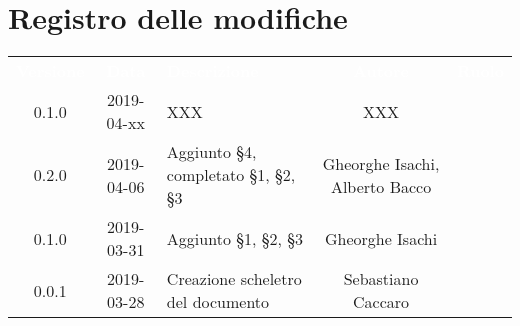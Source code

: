 \section*{Registro delle modifiche}
{
	\renewcommand{\arraystretch}{1.5}
	\centering
	\begin{longtable}{ c c C{6cm} c c }
		\textcolor{white}{\textbf{Versione}} & \textcolor{white}{\textbf{Data}} & \textcolor{white}{\textbf{Descrizione}} & \textcolor{white}{\textbf{Autore}} & \textcolor{white}{\textbf{Ruolo}}\\
			
		0.1.0 & 2019-04-xx & XXX & XXX & \ver{} \\ 

		0.2.0 & 2019-04-06 & Aggiunto \S4, completato \S1, \S2, \S3 & Gheorghe Isachi, Alberto Bacco & \reda{} \\
		
		0.1.0 & 2019-03-31 & Aggiunto \S1, \S2, \S3 & Gheorghe Isachi & \reda{} \\
		
		0.0.1 & 2019-03-28 & Creazione scheletro del documento & Sebastiano Caccaro & \reda{}
		
	\end{longtable}

}